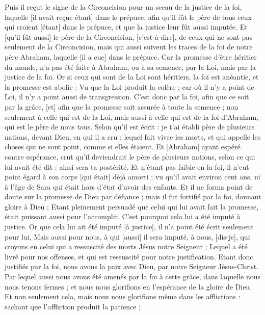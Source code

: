 \begin{multicols}{2}
Puis il reçut le signe de la Circoncision pour un sceau de la justice de la foi, laquelle [il avait reçue étant] dans le prépuce, afin qu'il fût le père de tous ceux qui croient [étant] dans le prépuce, et que la justice leur fût aussi imputée.
Et [qu'il fût aussi] le père de la Circoncision, [c'est-à-dire], de ceux qui ne sont pas seulement de la Circoncision, mais qui aussi suivent les traces de la foi de notre père Abraham, laquelle [il a eue] dans le prépuce.
Car la promesse d'être héritier du monde, n'a pas été faite à Abraham, ou à sa semence, par la Loi, mais par la justice de la foi.
Or si ceux qui sont de la Loi sont héritiers, la foi est anéantie, et la promesse est abolie :
Vu que la Loi produit la colère ; car où il n'y a point de Loi, il n'y a point aussi de transgression.
C'est donc par la foi, afin que ce soit par la grâce, [et] afin que la promesse soit assurée à toute la semence ; non seulement à celle qui est de la Loi, mais aussi à celle qui est de la foi d'Abraham, qui est le père de nous tous.
Selon qu'il est écrit : je t'ai établi père de plusieurs nations, devant Dieu, en qui il a cru ; lequel fait vivre les morts, et qui appelle les choses qui ne sont point, comme si elles étaient.
Et [Abraham] ayant espéré contre espérance, crut qu'il deviendrait le père de plusieurs nations, selon ce qui lui avait été dit : ainsi sera ta postérité.
Et n'étant pas faible en la foi, il n'eut point égard à son corps [qui était] déjà amorti ; vu qu'il avait environ cent ans, ni à l'âge de Sara qui était hors d'état d'avoir des enfants.
Et il ne forma point de doute sur la promesse de Dieu par défiance ; mais il fut fortifié par la foi, donnant gloire à Dieu ;
Etant pleinement persuadé que celui qui lui avait fait la promesse, était puissant aussi pour l'accomplir.
C'est pourquoi cela lui a été imputé à justice.
Or que cela lui ait été imputé [à justice], il n'a point été écrit seulement pour lui,
Mais aussi pour nous, à qui [aussi] il sera imputé, à nous, [dis-je], qui croyons en celui qui a ressuscité des morts Jésus notre Seigneur ;
Lequel a été livré pour nos offenses, et qui est ressuscité pour notre justification.
\VerseOne{}Etant donc justifiés par la foi, nous avons la paix avec Dieu, par notre Seigneur Jésus-Christ.
Par lequel aussi nous avons été amenés par la foi à cette grâce, dans laquelle nous nous tenons fermes ; et nous nous glorifions en l'espérance de la gloire de Dieu.
Et non seulement cela, mais nous nous glorifions même dans les afflictions : sachant que l'affliction produit la patience ;

\end{multicols}
